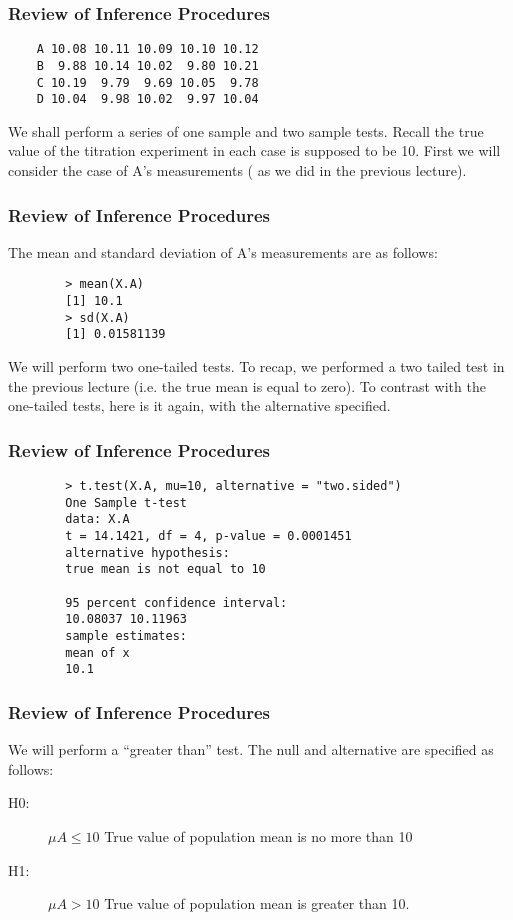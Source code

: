 \documentclass{beamer}
\begin{document}
\begin{frame}[fragile]
	\frametitle{Review of Inference Procedures}
	\large
	
	\begin{verbatim}
	A 10.08 10.11 10.09 10.10 10.12
	B  9.88 10.14 10.02  9.80 10.21
	C 10.19  9.79  9.69 10.05  9.78
	D 10.04  9.98 10.02  9.97 10.04
	\end{verbatim}
	We shall perform a series of one sample and two sample tests.
	Recall the true value of the titration experiment in each case is
	supposed to be 10.
	First we will consider the case of A’s measurements ( as we did in
	the previous lecture).
\end{frame}
\begin{frame}[fragile]
	\frametitle{Review of Inference Procedures}
	The mean and standard deviation of A’s measurements are as
	follows:
	\begin{framed}
		\begin{verbatim}
		> mean(X.A)
		[1] 10.1
		> sd(X.A)
		[1] 0.01581139
		\end{verbatim}
	\end{framed}
	We will perform two one-tailed tests. To recap, we performed a two
	tailed test in the previous lecture (i.e. the true mean is equal to
	zero). To contrast with the one-tailed tests, here is it again, with
	the alternative specified.
\end{frame}
\begin{frame}[fragile]
	\frametitle{Review of Inference Procedures}
	\large
	\begin{framed}
		\begin{verbatim}
		> t.test(X.A, mu=10, alternative = "two.sided")
		One Sample t-test
		data: X.A
		t = 14.1421, df = 4, p-value = 0.0001451
		alternative hypothesis: 
		true mean is not equal to 10
		
		95 percent confidence interval:
		10.08037 10.11963
		sample estimates:
		mean of x
		10.1
		\end{verbatim}
	\end{framed}
\end{frame}
\begin{frame}[fragile]
	\frametitle{Review of Inference Procedures}
	\large
	We will perform a “greater than” test. The null and alternative are
	specified as follows:
	\begin{description}
		\item[H0:] $μA \leq 10$ True value of population mean is no more than 10
		\item[H1:] $μA > 10$ True value of population mean is greater than 10.
	\end{description}
	
	
\end{frame}
\end{document}
